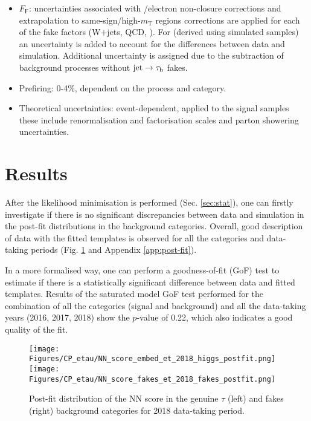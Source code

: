\begin{itemize}
    \item $F_\text{F}$: uncertainties associated with \met/electron \pt non-closure corrections and extrapolation to same-sign/high-$m_\text{T}$ regions corrections are applied for each of the fake factors (W+jets, QCD, \ttbar). For \ttbar \ff (derived using simulated samples) an uncertainty is added to account for the differences between data and simulation. Additional uncertainty is assigned due to the subtraction of background processes without $\text{jet}\to\tau_\mathrm{h}$ fakes.
    \item Prefiring: 0-4\%, dependent on the process and category.
    \item Theoretical uncertainties: event-dependent, applied to the signal samples these include renormalisation and factorisation scales and parton showering uncertainties.
\end{itemize}

\section{Results}\label{sec:results}

After the likelihood minimisation is performed (Sec. \ref{sec:stat}), one can firstly investigate if there is no significant discrepancies between data and simulation in the post-fit distributions in the background categories. Overall, good description of data with the fitted templates is observed for all the categories and data-taking periods (Fig. \ref{fig:bkgr_cat_postfit} and Appendix \ref{app:post-fit}).

In a more formalised way, one can perform a goodness-of-fit (GoF) test to estimate if there is a statistically significant difference between data and fitted templates. Results of the saturated model GoF test \cite{Cousins2013GeneralizationOC} performed for the combination of all the categories (signal and background) and all the data-taking years (2016, 2017, 2018) show the $p$-value of 0.22, which also indicates a good quality of the fit.

\begin{figure}[H]
    \centering
    \texttt{[image: Figures/CP\_etau/NN\_score\_embed\_et\_2018\_higgs\_postfit.png]}
    \texttt{[image: Figures/CP\_etau/NN\_score\_fakes\_et\_2018\_fakes\_postfit.png]}
    \caption{Post-fit distribution of the NN score in the genuine $\tau$ (left) and fakes (right) background categories for 2018 data-taking period.}
    \label{fig:bkgr_cat_postfit}
\end{figure}

